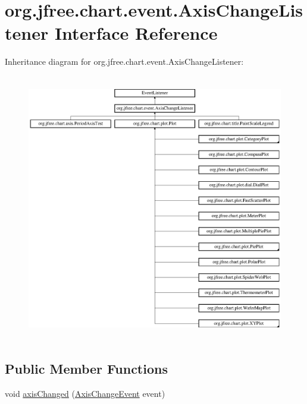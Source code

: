 \hypertarget{interfaceorg_1_1jfree_1_1chart_1_1event_1_1_axis_change_listener}{}\section{org.\+jfree.\+chart.\+event.\+Axis\+Change\+Listener Interface Reference}
\label{interfaceorg_1_1jfree_1_1chart_1_1event_1_1_axis_change_listener}
Inheritance diagram for org.\+jfree.\+chart.\+event.\+Axis\+Change\+Listener\+:\begin{figure}[H]
\begin{center}
\leavevmode
\includegraphics[height=11.758530cm]{interfaceorg_1_1jfree_1_1chart_1_1event_1_1_axis_change_listener}
\end{center}
\end{figure}
\subsection*{Public Member Functions}
\begin{DoxyCompactItemize}
\item 
void \mbox{\hyperlink{interfaceorg_1_1jfree_1_1chart_1_1event_1_1_axis_change_listener_a0598d6b49c0ec1aff38fe39d34297b87}{axis\+Changed}} (\mbox{\hyperlink{classorg_1_1jfree_1_1chart_1_1event_1_1_axis_change_event}{Axis\+Change\+Event}} event)
\end{DoxyCompactItemize}


